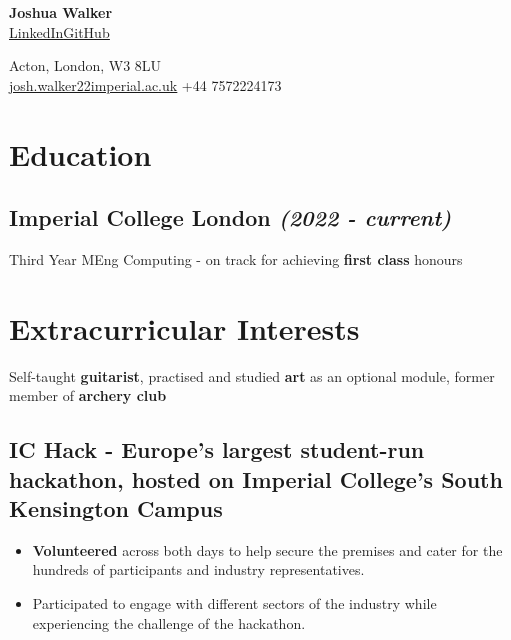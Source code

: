 \documentclass{article}
\makeatletter
\newcommand{\contact}[1]{\normalsize{#1}}
\newcommand{\contactdiv}{\hspace*{0.8em}}
\newcommand{\email}[2]{\href{mailto:#1@#2}{\underline{#1{\small\fontfamily{phv}\selectfont@}#2}}}
\newcommand{\linkedin}{\href{https://www.linkedin.com/in/joshua-walker-080714238/}{\underline{LinkedIn}}}
\newcommand{\github}{\href{https://github.com/josh-ja-walker}{\underline{GitHub}}}
\newcommand{\dates}[1]{\hfill\textit{(#1)}}
\newcommand{\indentsubsection}[2]{
    \subsection*{#1}
    #2
}
\makeatother
\begin{document}
\begin{multicols}{2}

    \begin{flushleft}
        {\LARGE\textbf{Joshua Walker}}\\
        \vspace{0.5em}
        \linkedin\contactdiv\github
    \end{flushleft}
    
    \columnbreak
    
    \begin{flushright}
        \contact{Acton, London, W3 8LU}\\
        \vspace{0.5em}
        \contact{\email{josh.walker22}{imperial.ac.uk}}
        \contactdiv
        \contact{+44 7572224173}
    \end{flushright}
    
\end{multicols}

\vspace{-1em}

\section*{Education}

\indentsubsection{\textbf{Imperial College London} \dates{2022 - current}}{
    Third Year MEng Computing - on track for achieving \textbf{first class} honours
}


\section*{Extracurricular Interests}
Self-taught \textbf{guitarist}, 
    practised and studied \textbf{art} as an optional module, 
    former member of \textbf{archery club}

\vspace{-0.65em}

\indentsubsection{\textbf{IC Hack} - Europe's largest student-run hackathon, hosted on Imperial College's South Kensington Campus}{
    \vspace{-0.25em}
    \begin{itemize}[topsep=0em, itemsep=0.05em]
        \item \textbf{Volunteered} across both days to help secure the premises and cater for the hundreds of participants and industry representatives.
        \item Participated to engage with different sectors of the industry while experiencing the challenge of the hackathon.
    \end{itemize}
}
\end{document}
